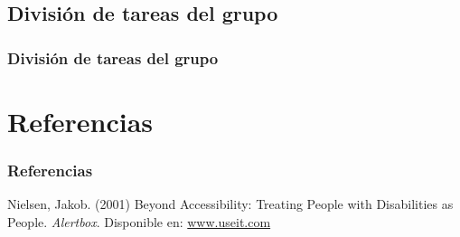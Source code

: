 \subsection{División de tareas del grupo}
\begin{frame}
	\frametitle{División de tareas del grupo}

\end{frame}

\section{Referencias}

\begin{frame}
	\frametitle{Referencias}
	\footnotesize{
	\begin{thebibliography}{99}
		 Nielsen, Jakob. (2001)
		\newblock Beyond Accessibility: Treating People with Disabilities as People.
		\newblock \emph{Alertbox}.
		Disponible en:
		\href{http://www.useit.com/alertbox/20011111.html}{www.useit.com}
	\end{thebibliography}
	}
\end{frame}